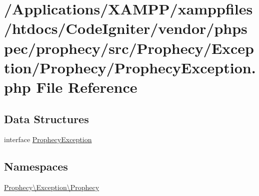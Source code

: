 \hypertarget{_prophecy_exception_8php}{}\section{/\+Applications/\+X\+A\+M\+P\+P/xamppfiles/htdocs/\+Code\+Igniter/vendor/phpspec/prophecy/src/\+Prophecy/\+Exception/\+Prophecy/\+Prophecy\+Exception.php File Reference}
\label{_prophecy_exception_8php}
\subsection*{Data Structures}
\begin{DoxyCompactItemize}
\item 
interface \mbox{\hyperlink{interface_prophecy_1_1_exception_1_1_prophecy_1_1_prophecy_exception}{Prophecy\+Exception}}
\end{DoxyCompactItemize}
\subsection*{Namespaces}
\begin{DoxyCompactItemize}
\item 
 \mbox{\hyperlink{namespace_prophecy_1_1_exception_1_1_prophecy}{Prophecy\textbackslash{}\+Exception\textbackslash{}\+Prophecy}}
\end{DoxyCompactItemize}
